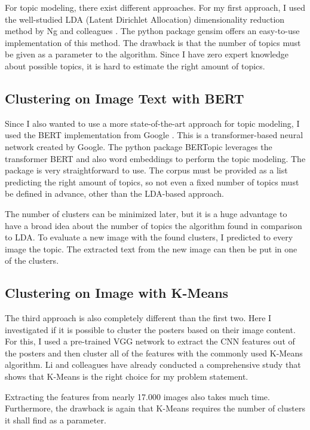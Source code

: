 \documentclass[conference]{IEEEtran}
\begin{document}
For topic modeling, there exist different approaches. For my first approach, I used the well-studied LDA (Latent Dirichlet Allocation) dimensionality reduction method by Ng and colleagues \cite{Blei.2001}. The python package gensim offers an easy-to-use implementation of this method. The drawback is that the number of topics must be given as a parameter to the algorithm. Since I have zero expert knowledge about possible topics, it is hard to estimate the right amount of topics.

\subsection{Clustering on Image Text with BERT}

Since I also wanted to use a more state-of-the-art approach for topic modeling, I used the BERT implementation from Google \cite{Devlin.2019}. This is a transformer-based neural network created by Google. The python package BERTopic leverages the transformer BERT and also word embeddings to perform the topic modeling. The package is very straightforward to use. The corpus must be provided as a list predicting the right amount of topics, so not even a fixed number of topics must be defined in advance, other than the LDA-based approach.

The number of clusters can be minimized later, but it is a huge advantage to have a broad idea about the number of topics the algorithm found in comparison to LDA. To evaluate a new image with the found clusters, I predicted to every image the topic. The extracted text from the new image can then be put in one of the clusters.

\subsection{Clustering on Image with K-Means}

The third approach is also completely different than the first two. Here I investigated if it is possible to cluster the posters based on their image content. For this, I used a pre-trained VGG network to extract the CNN features out of the posters and then cluster all of the features with the commonly used K-Means algorithm. Li and colleagues have already conducted a comprehensive study \cite{Li.2012} that shows that K-Means is the right choice for my problem statement.

Extracting the features from nearly 17.000 images also takes much time. Furthermore, the drawback is again that K-Means requires the number of clusters it shall find as a parameter. 
\end{document}
